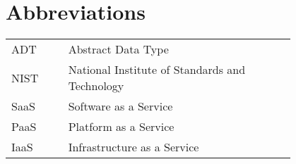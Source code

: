 \chapter*{Abbreviations}

\begin{flushleft}
\begin{tabular}{l p{0.8\linewidth}}
ADT      & Abstract Data Type\\
NIST     & National Institute of Standards and Technology\\
SaaS     & Software as a Service\\
PaaS     & Platform as a Service\\
IaaS     & Infrastructure as a Service\\
\end{tabular}
\end{flushleft}

